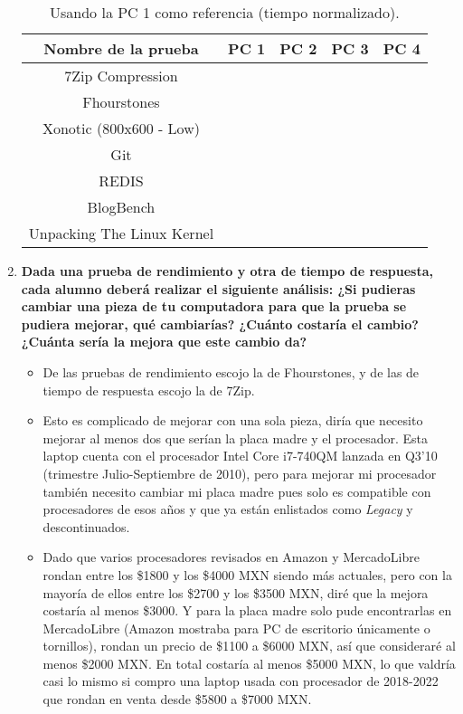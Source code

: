 \documentclass[12pt]{article}
\newcommand{\pl}[1]{\item \textbf{ #1 }}
\begin{document}
\begin{enumerate}[label=(\arabic{section}.\arabic{subsection}.\arabic{enumi})]
    \begin{table}[htb]
        \centering
        \begin{tabular}{|c|c|c|c|c|}
        \hline
        \textbf{Nombre de la prueba} & \textbf{PC 1} & \textbf{PC 2} & \textbf{PC 3} & \textbf{PC 4}\\
        \hline
        7Zip Compression & & & & \\
        \hline
        Fhourstones & & & & \\
        \hline
        Xonotic (800x600 - Low) & & & &  \\
        \hline
        Git & & & &  \\
        \hline
        REDIS & & & &  \\
        \hline
        BlogBench & & & &  \\
        \hline
        Unpacking The Linux Kernel & & & & \\
        \hline
        \end{tabular}
        \caption{Usando la PC 1 como referencia (tiempo normalizado).}
    \end{table}

    \pl{Dada una prueba de rendimiento y otra de tiempo de respuesta, cada alumno deberá realizar el siguiente análisis: ¿Si pudieras cambiar una pieza de tu computadora para que la prueba se pudiera mejorar, qué cambiarías? ¿Cuánto costaría el cambio? ¿Cuánta sería la mejora que este cambio da?}
    
    \begin{itemize}
        \item De las pruebas de rendimiento escojo la de Fhourstones, y de las de tiempo de respuesta escojo la de 7Zip.

        \item Esto es complicado de mejorar con una sola pieza, diría que necesito mejorar al menos dos que serían la placa madre y el procesador. Esta laptop cuenta con el procesador Intel Core i7-740QM lanzada en Q3'10 (trimestre Julio-Septiembre de 2010), pero para mejorar mi procesador también necesito cambiar mi placa madre pues solo es compatible con procesadores de esos años y que ya están enlistados como \textit{Legacy} y descontinuados.

        \item Dado que varios procesadores revisados en Amazon y MercadoLibre rondan entre los \$1800 y los \$4000 MXN siendo más actuales, pero con la mayoría de ellos entre los \$2700 y los \$3500 MXN, diré que la mejora costaría al menos \$3000. Y para la placa madre solo pude encontrarlas en MercadoLibre (Amazon mostraba para PC de escritorio únicamente o tornillos), rondan un precio de \$1100 a \$6000 MXN, así que consideraré al menos \$2000 MXN. En total costaría al menos \$5000 MXN, lo que valdría casi lo mismo si compro una laptop usada con procesador de 2018-2022 que rondan en venta desde \$5800 a \$7000 MXN.


\end{itemize}
\end{enumerate}
\end{document}
